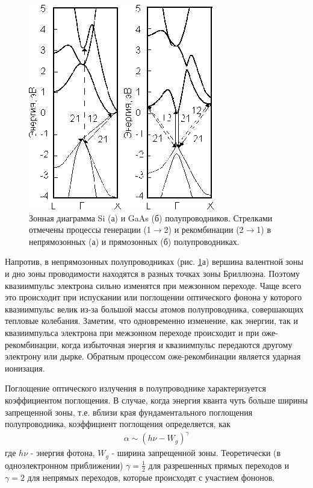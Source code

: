 \begin{figure}
	\centering
	\includegraphics[width = .9\linewidth]{img/3}
	\caption{Зонная диаграмма Si (а) и GaAs (б) полупроводников. 
Стрелками отмечены процессы генерации (1$\to$2) и рекомбинации (2$\to$1) в непрямозонных (а) и прямозонных (б)
полупроводниках.}
	\label{fig:figure2}
\end{figure}
% 

Напротив, в непрямозонных полупроводниках (рис.  \ref{fig:figure2}а) вершина валентной зоны и дно зоны проводимости
находятся в разных точках зоны Бриллюэна. Поэтому квазиимпульс электрона сильно изменятся при межзонном переходе. Чаще
всего это происходит при испускании или поглощении оптического фонона у которого квазиимпульс велик из-за большой массы
атомов полупроводника, совершающих тепловые колебания. Заметим, что одновременно изменение, как энергии, так и
квазиимпульса электрона при межзонном переходе происходит и при оже-рекомбинации, когда избыточная энергия и
квазиимпульс передаются другому электрону или дырке. Обратным процессом оже-рекомбинации является ударная ионизация.



Поглощение оптического излучения в полупроводнике характеризуется коэффициентом поглощения. В случае, когда энергия
кванта чуть больше ширины запрещенной зоны, т.е. вблизи края фундаментального поглощения полупроводника, коэффициент
поглощения определяется, как 
\begin{gather}
	\label{eq3}
	\alpha \sim\left(h\nu-W_{g}\right)^{\gamma}
\end{gather}
где $h\nu$ - энергия фотона, $W_g$ - ширина запрещенной зоны. Теоретически (в одноэлектронном приближении) $\gamma=\frac12$ для разрешенных
прямых переходов и $\gamma=2$ для непрямых переходов, которые происходят с участием фононов.

